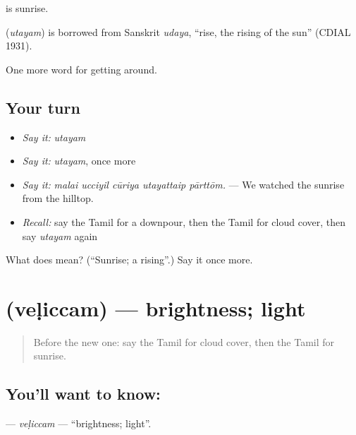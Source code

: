   is sunrise.

\begin{cousinweb}
\textbf{} (\emph{utayam}) is borrowed from Sanskrit \emph{udaya}, \textquotedblleft{}rise, the rising of the sun\textquotedblright{} (CDIAL 1931).
\end{cousinweb}

\begin{grammarlens}[title={What you've built}]
One more word for getting around.
\end{grammarlens}

\subsection*{Your turn}
\begin{itemize}
\raggedright
  \item \emph{Say it:} \emph{utayam}
  \item \emph{Say it:} \emph{utayam}, once more
  \item \emph{Say it:} \emph{malai ucciyil cūriya utayattaip pārttōm.} — We watched the sunrise from the hilltop.
  \item \emph{Recall:} say the Tamil for a downpour, then the Tamil for cloud cover, then say \emph{utayam} again
\end{itemize}

\begin{tcolorbox}[breakable,colback=teal!4,colframe=teal!35!black,title={Before you move on}]
What does  mean? (\textquotedblleft{}Sunrise; a rising\textquotedblright{}.) Say it once more.
\end{tcolorbox}
\section[\texorpdfstring{\ta{வெளிச்சம்} (veḷiccam)}{வெளிச்சம் (veḷiccam)}]{ (veḷiccam) — brightness; light}

\label{lesson:TA-C430-veliccam}



\begin{quote}
Before the new one: say the Tamil for cloud cover, then the Tamil for sunrise.
\end{quote}

\subsection*{You'll want to know: }
\textbf{} — \emph{veḷiccam} — \textquotedblleft{}brightness; light\textquotedblright{}.

